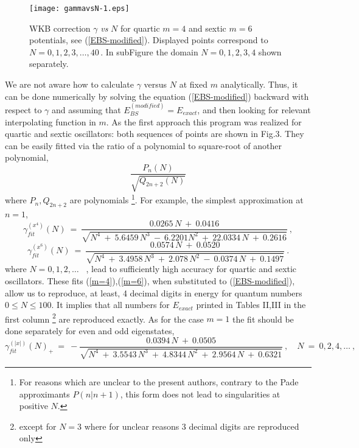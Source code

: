 \documentclass[preprint,preprintnumbers,amsmath,amssymb]{revtex4}
\begin{document}
\begin{figure}[h]
	\centering
	\texttt{[image: gammavsN-1.eps]}
	\caption{\label{m=4,6} WKB correction $\gamma$ {\it vs} $N$ for quartic $m=4$ and
     sextic $m=6$ potentials, see (\ref{EBS-modified}). Displayed points correspond to $N=0,1,2,3,\ldots, 40$\,. In subFigure the domain $N=0,1,2,3,4$ shown separately. }
\end{figure}
We are not aware how to calculate $\gamma$ versus $N$ at fixed $m$ analytically. Thus, it can be done numerically by solving the equation (\ref{EBS-modified}) backward with respect to $\gamma$ and assuming that $E^{(modified)}_{BS} = E_{exact}$, and then looking for relevant interpolating function in $m$. As the first approach this program was realized for quartic and sextic oscillators:
both sequences of points are shown in Fig.3.
They can be easily fitted via the ratio of a polynomial to square-root of another polynomial, 
\[
    \frac{P_n(N)}{\sqrt{Q_{2n+2}(N)}}
\]
where $P_n,Q_{2n+2}$ are polynomials \footnote{For reasons which are unclear to the present authors, contrary to the Pade approximants $P(n|n+1)$, this form does not lead to singularities at positive $N$.}. For example, the simplest approximation at $n=1$,
\begin{equation}
\label{m=4}
\gamma_{fit}^{(x^4)}(N) \ =\ \frac{0.0265\,  N\ +\ 0.0416}{\sqrt{N^4\ +\ 5.6459\,N^3\ -\ 6.2201 N^2\ +\ 22.0334\,N\ +\ 0.2616}}\ ,
\end{equation}
\begin{equation}
\label{m=6}
	\gamma_{fit}^{(x^6)}(N) \ =\ \frac{0.0574\,  N \ +\ 0.0520}{\sqrt{N^4\ +\ 3.4958\,  N^3\ +\ 2.078 \,  N^2\ -\ 0.0374\,  N\ +\ 0.1497}}\ .
\end{equation}
where $N=0,1,2,\ldots$ \ ,
lead to sufficiently high accuracy for quartic and sextic oscillators. 
These fits (\ref{m=4}),(\ref{m=6}), when substituted to (\ref{EBS-modified}), allow us to reproduce, at least, 4 decimal digits in energy for quantum numbers $0 \leq N \leq 100$. It implies that all numbers for $E_{exact}$ printed in Tables II,III in the first column \footnote{except for $N=3$ where for unclear reasons 3 decimal digits are reproduced only} are reproduced exactly.
As for the case $m=1$ the fit should be done separately for even and odd eigenstates,
\begin{equation}
\label{m=1+}
    \gamma_{fit}^{(|x|)}(N)_+\ =\ -\frac{0.0394\, N\ +\ 0.0505}{\sqrt{N^4\ +\ 3.5543\, N^3\ +\ 4.8344\, N^2\ +\ 2.9564\,N\ +\ 0.6321}}\ ,\quad N\ =\ 0,2,4,\ldots \ ,
\end{equation}
\end{document}
